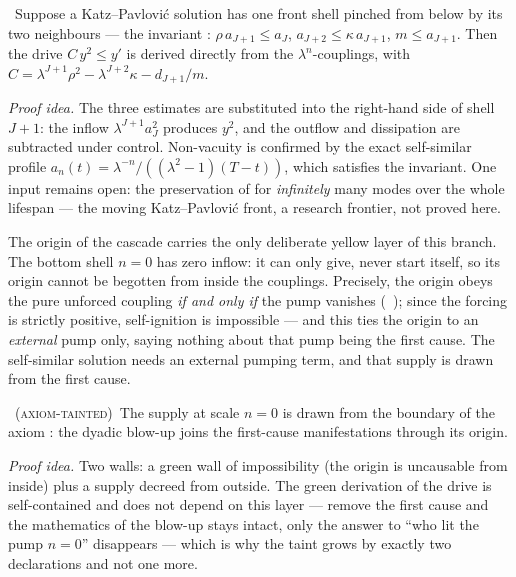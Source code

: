 \begin{theorem}\label{thm:frontDrive_of_invariant}
\green{}\ Suppose a Katz--Pavlovi\'c solution has one front shell pinched from below by its two
neighbours --- the invariant : $\rho\, a_{J+1} \le a_J$,
$a_{J+2} \le \kappa\, a_{J+1}$, $m \le a_{J+1}$. Then the drive $C\,y^2 \le y'$ is derived directly
from the $\lambda^n$-couplings, with $C = \lambda^{J+1}\rho^2 - \lambda^{J+2}\kappa - d_{J+1}/m$.
\end{theorem}

\emph{Proof idea.} The three estimates are substituted into the right-hand side of shell $J+1$: the
inflow $\lambda^{J+1} a_J^2$ produces $y^2$, and the outflow and dissipation are subtracted under
control. Non-vacuity is confirmed by the exact self-similar profile
$a_n(t) = \lambda^{-n}/((\lambda^2-1)(T-t))$, which satisfies the invariant. One input remains open:
the preservation of  for \emph{infinitely} many modes over the whole lifespan
--- the moving Katz--Pavlovi\'c front, a research frontier, not proved here.

The origin of the cascade carries the only deliberate yellow layer of this branch. The bottom shell
$n = 0$ has zero inflow: it can only give, never start itself, so its origin cannot be begotten from
inside the couplings. Precisely, the origin obeys the pure unforced coupling \emph{if and only if} the
pump vanishes (\green{}\ ); since the forcing is strictly
positive, self-ignition is impossible --- and this ties the origin to an \emph{external} pump only,
saying nothing about that pump being the first cause. The self-similar solution needs an external
pumping term, and that supply is drawn from the first cause.

\begin{theorem}\label{thm:dyadicBlowup_is_firstCauseManifestation}
\yellow{}~(\textsc{axiom-tainted})\ The supply at scale $n = 0$ is drawn from the boundary
 of the axiom \axiom{}: the dyadic blow-up joins the first-cause manifestations
through its origin. 
\end{theorem}

\emph{Proof idea.} Two walls: a green wall of impossibility (the origin is uncausable from inside)
plus a supply decreed from outside. The green derivation of the drive is self-contained and does not
depend on this layer --- remove the first cause and the mathematics of the blow-up stays intact,
only the answer to ``who lit the pump $n=0$'' disappears --- which is why the taint grows by exactly
two declarations and not one more.

